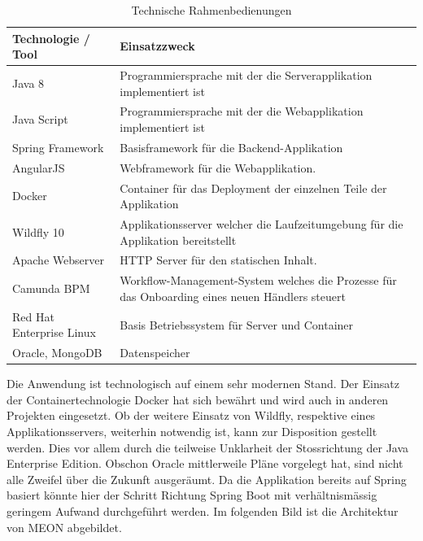 \begin{table}[H]
	\centering
	\caption{Technische Rahmenbedienungen}
	\begin{tabular}{ | p{4cm} | p{10cm} | }
		\toprule
		{\textbf{Technologie / Tool}} & {\textbf{Einsatzzweck}} \\
		\midrule
		Java 8 & Programmiersprache mit der die Serverapplikation implementiert ist \\ \hline
		Java Script & Programmiersprache mit der die Webapplikation implementiert ist \\ \hline
		Spring Framework & Basisframework für die Backend-Applikation  \\ \hline
		AngularJS & Webframework für die Webapplikation. \\ \hline
		Docker & Container für das Deployment der einzelnen Teile der Applikation \\ \hline
		Wildfly 10 & Applikationsserver welcher die Laufzeitumgebung für die Applikation bereitstellt \\ \hline
		Apache Webserver & HTTP Server für den statischen Inhalt. \\ \hline
		Camunda BPM & Workflow-Management-System welches die Prozesse für das Onboarding eines neuen Händlers steuert \\ \hline
		Red Hat Enterprise Linux & Basis Betriebssystem für Server und Container\\ \hline
		Oracle, MongoDB & Datenspeicher \\
		\bottomrule
	\end{tabular}
\end{table}

Die Anwendung ist technologisch auf einem sehr modernen Stand. Der Einsatz der Containertechnologie Docker hat sich bewährt und wird auch in anderen Projekten eingesetzt. Ob der weitere Einsatz von Wildfly, respektive eines Applikationsservers, weiterhin notwendig ist, kann zur Disposition gestellt werden. Dies vor allem durch die teilweise Unklarheit der Stossrichtung der Java Enterprise Edition. Obschon Oracle mittlerweile Pläne vorgelegt hat, sind nicht alle Zweifel über die Zukunft ausgeräumt. Da die Applikation bereits auf Spring basiert könnte hier der Schritt Richtung Spring Boot mit verhältnismässig geringem Aufwand durchgeführt werden.
Im folgenden Bild ist die Architektur von MEON abgebildet.

